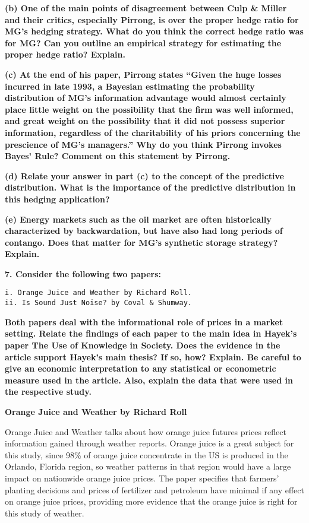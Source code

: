 \documentclass[11pt]{article}
\begin{document}
    \textbf{(b) One of the main points of disagreement between Culp \&
Miller and their critics, especially Pirrong, is over the proper hedge
ratio for MG's hedging strategy. What do you think the correct hedge
ratio was for MG? Can you outline an empirical strategy for estimating
the proper hedge ratio? Explain.}

    \textbf{(c) At the end of his paper, Pirrong states ``Given the huge
losses incurred in late 1993, a Bayesian estimating the probability
distribution of MG's information advantage would almost certainly place
little weight on the possibility that the firm was well informed, and
great weight on the possibility that it did not possess superior
information, regardless of the charitability of his priors concerning
the prescience of MG's managers.'' Why do you think Pirrong invokes
Bayes' Rule? Comment on this statement by Pirrong.}

    \textbf{(d) Relate your answer in part (c) to the concept of the
predictive distribution. What is the importance of the predictive
distribution in this hedging application?}

    \textbf{(e) Energy markets such as the oil market are often historically
characterized by backwardation, but have also had long periods of
contango. Does that matter for MG's synthetic storage strategy?
Explain.}

    \textbf{7. Consider the following two papers:}

\begin{verbatim}
i. Orange Juice and Weather by Richard Roll.
ii. Is Sound Just Noise? by Coval & Shumway.
\end{verbatim}

    \textbf{Both papers deal with the informational role of prices in a
market setting. Relate the findings of each paper to the main idea in
Hayek's paper The Use of Knowledge in Society. Does the evidence in the
article support Hayek's main thesis? If so, how? Explain. Be careful to
give an economic interpretation to any statistical or econometric
measure used in the article. Also, explain the data that were used in
the respective study.}

    \textbf{Orange Juice and Weather by Richard Roll}

    Orange Juice and Weather talks about how orange juice futures prices
reflect information gained through weather reports. Orange juice is a
great subject for this study, since 98\% of orange juice concentrate in
the US is produced in the Orlando, Florida region, so weather patterns
in that region would have a large impact on nationwide orange juice
prices. The paper specifies that farmers' planting decisions and prices
of fertilizer and petroleum have minimal if any effect on orange juice
prices, providing more evidence that the orange juice is right for this
study of weather.
\end{document}

